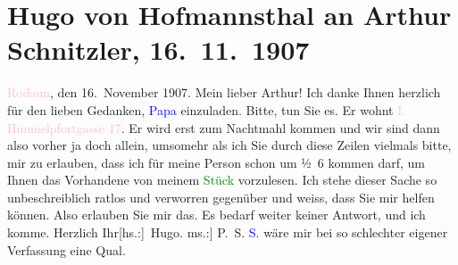 

               \section[Hugo von Hofmannsthal an Arthur Schnitzler, 16. 11. 1907]{ Hugo von Hofmannsthal an Arthur Schnitzler, 16. 11. 1907}\nopagebreak{}\rehead{ }\normalsize\beginnumbering{} \toendnotes[C]{\smallbreak\pagebreak[2]} 
\toendnotes[C]{\smallbreak}\pstart
           \raggedleft{}{\pb}\textcolor{pink}{Rodaun}{}\ledrightnote{\textcolor{pink}{Rodaun}}, den 16. November
                  1907.\pend
           \pstart{}Mein lieber Arthur!\pend\pstart
           Ich danke Ihnen herzlich für den lieben Gedanken, \textcolor{blue}{Papa}{} einzuladen. Bitte, tun Sie es. Er wohnt \textcolor{pink}{I. Himmelpfortgasse 17}{}\ledrightnote{\textcolor{pink}{Himmelpfortgasse}}. Er wird erst zum Nachtmahl
               kommen und wir sind dann also vorher ja doch allein, umsomehr als ich Sie durch
               diese Zeilen vielmals bitte, mir zu erlauben, dass ich für meine Person schon um
                  ½ 6 kommen darf, um Ihnen das Vorhandene von meinem \textcolor{green}{Stück}{} vorzulesen. Ich stehe dieser Sache so
               unbeschreiblich ratlos und verworren gegenüber und weiss, dass Sie mir helfen
               können. Also erlauben Sie mir das. Es bedarf weiter keiner Antwort, und ich
               komme.\pend
           \pstart Herzlich Ihr\spacefill\mbox{{[}hs.:{]}  Hugo.}\pend{}\pstart
           \noindent{}{[}ms.:{]} P. S. \textcolor{blue}{S.}{}\ledrightnote{\textcolor{blue}{Gustav Schwarzkopf}} wäre mir bei so schlechter eigener
                  Verfassung eine Qual.\pend
           \endnumbering{}  
      